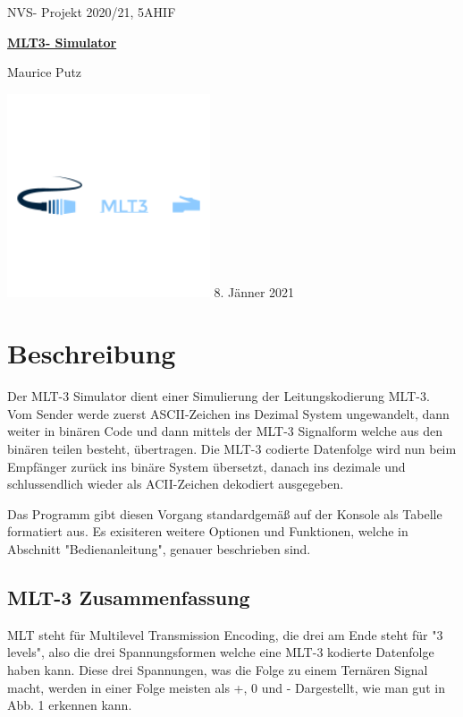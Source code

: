 \documentclass{article}
\begin{document}
\begin{titlepage}
    \centering
NVS- Projekt 2020/21, 5AHIF

\vskip4cm
    {\bfseries\Large
        \huge\underline{MLT3- Simulator}

	Maurice Putz\\
    }
    \includegraphics[width=6cm]{mlt3logo.png}
    \vskip6cm
 8. Jänner 2021\\
\end{titlepage}

\newpage
\tableofcontents
\newpage
{}

\section{Beschreibung}

Der MLT-3 Simulator dient einer Simulierung der Leitungskodierung MLT-3. Vom Sender werde zuerst ASCII-Zeichen 
ins Dezimal System ungewandelt, dann weiter in binären Code und dann mittels der MLT-3 Signalform welche aus
den binären teilen besteht, übertragen. Die MLT-3 codierte Datenfolge wird nun beim Empfänger zurück ins binäre System
übersetzt, danach ins dezimale und schlussendlich wieder als ACII-Zeichen dekodiert ausgegeben.

Das Programm gibt diesen Vorgang standardgemäß auf der Konsole als Tabelle formatiert aus. Es exisiteren weitere
Optionen und Funktionen, welche in Abschnitt "Bedienanleitung", genauer beschrieben sind.

\subsection{MLT-3 Zusammenfassung}

MLT steht für Multilevel Transmission Encoding, die drei am Ende steht für "3 levels", also die drei Spannungsformen welche eine
MLT-3 kodierte Datenfolge haben kann. Diese drei Spannungen, was die Folge zu einem Ternären Signal macht,
werden in einer Folge meisten als +, 0 und - Dargestellt, wie man gut in Abb. 1 erkennen kann.
\end{document}
